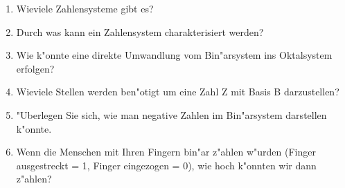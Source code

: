 \documentclass[a4paper,10pt]{article}
\begin{document}
\begin{enumerate}
\item Wieviele Zahlensysteme gibt es?
\item Durch was kann ein Zahlensystem charakterisiert werden?
\item Wie k"onnte eine direkte Umwandlung vom Bin"arsystem ins Oktalsystem erfolgen?
\item Wieviele Stellen werden ben"otigt um eine Zahl Z mit Basis B darzustellen?
\item "Uberlegen Sie sich, wie man negative Zahlen im Bin"arsystem darstellen k"onnte.
\item Wenn die Menschen mit Ihren Fingern bin"ar z"ahlen w"urden (Finger ausgestreckt = 1, Finger eingezogen = 0), wie hoch k"onnten wir dann z"ahlen?
\end{enumerate}
\end{document}
